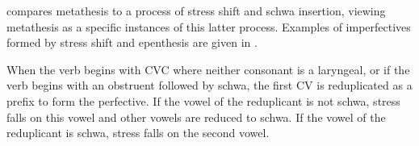 \citet{ur11} compares metathesis to a process of stress shift and schwa insertion,
viewing metathesis as a specific instances of this latter process.
Examples of imperfectives formed by stress shift
and epenthesis are given in .

\begin{exe}
	\label{ex:HalCCV->C@C@}
\end{exe}

When the verb begins with CVC where neither consonant is a laryngeal,
or if the verb begins with an obstruent followed by schwa,
the first CV is reduplicated as a prefix to form the perfective.
If the vowel of the reduplicant is not schwa, stress falls on this vowel
and other vowels are reduced to schwa.
If the vowel of the reduplicant is schwa, stress falls on the second vowel.

\newpage
\begin{exe}
	\label{ex:HalRed}
\end{exe}

